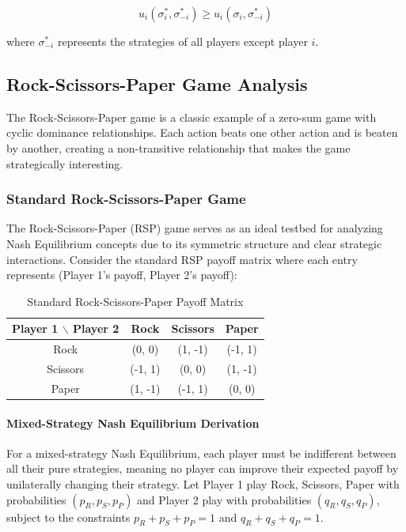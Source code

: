 \documentclass[conference]{IEEEtran}
\begin{document}
\begin{equation}
u_i(\sigma_i^*, \sigma_{-i}^*) \geq u_i(\sigma_i, \sigma_{-i}^*)
\end{equation}

where $\sigma_{-i}^*$ represents the strategies of all players except player $i$.

\subsection{Rock-Scissors-Paper Game Analysis}

The Rock-Scissors-Paper game is a classic example of a zero-sum game with cyclic dominance relationships. Each action beats one other action and is beaten by another, creating a non-transitive relationship that makes the game strategically interesting.

\subsubsection{Standard Rock-Scissors-Paper Game}

The Rock-Scissors-Paper (RSP) game serves as an ideal testbed for analyzing Nash Equilibrium concepts due to its symmetric structure and clear strategic interactions. Consider the standard RSP payoff matrix where each entry represents (Player 1's payoff, Player 2's payoff):

\begin{table}[h!]
\centering
\caption{Standard Rock-Scissors-Paper Payoff Matrix}
\begin{tabular}{|c|c|c|c|}
\hline
Player 1 $\backslash$ Player 2 & Rock & Scissors & Paper \\
\hline
Rock & (0, 0) & (1, -1) & (-1, 1) \\
Scissors & (-1, 1) & (0, 0) & (1, -1) \\
Paper & (1, -1) & (-1, 1) & (0, 0) \\
\hline
\end{tabular}
\label{tab:standard_rsp}
\end{table}

\paragraph{Mixed-Strategy Nash Equilibrium Derivation}

For a mixed-strategy Nash Equilibrium, each player must be indifferent between all their pure strategies, meaning no player can improve their expected payoff by unilaterally changing their strategy. Let Player 1 play Rock, Scissors, Paper with probabilities $(p_R, p_S, p_P)$ and Player 2 play with probabilities $(q_R, q_S, q_P)$, subject to the constraints $p_R + p_S + p_P = 1$ and $q_R + q_S + q_P = 1$.
\end{document}
